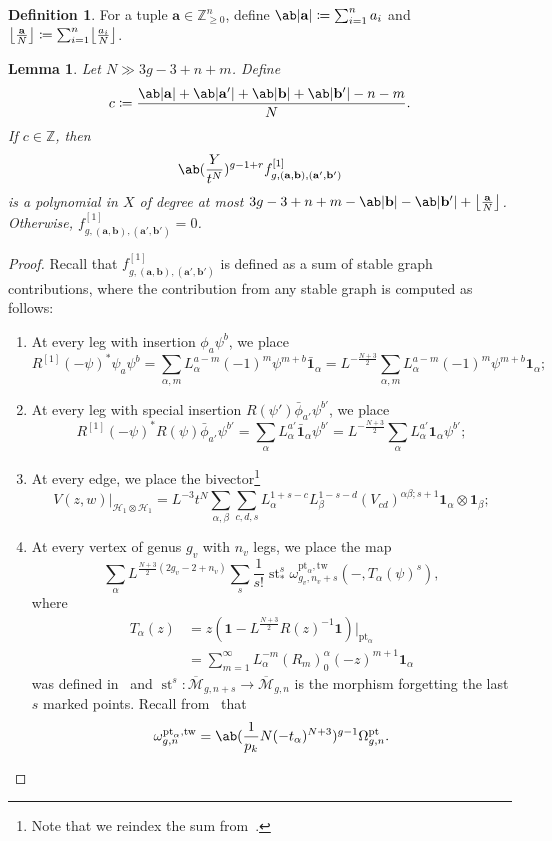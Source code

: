 \documentclass[10pt]{amsart}
\DeclarePairedDelimiter{\floor}{\lfloor}{\rfloor}
\newtheorem{lem}[thm]{Lemma}
\theoremstyle{definition}
\newtheorem{defn}[thm]{Definition}
\theoremstyle{remark}
\theoremstyle{plain}
\theoremstyle{definition}
\theoremstyle{remark}
\newcommand{\Z}{\mathbb{Z}}
\newcommand{\ba}{\mathbf{a}}
\newcommand{\bb}{\mathbf{b}}
\newcommand{\msc}[1]{\mathscr{#1}}
\newcommand{\mr}[1]{\mathrm{#1}}
\newcommand{\ol}[1]{\overline{#1}}
\newcommand{\1}{\mathbf{1}}
\newcommand{\2}{\mathbf{2}}
\newcommand{\3}{\mathbf{3}}
\newcommand{\pt}{\mr{pt}}
\newcommand{\tw}{\mr{tw}}
\DeclareMathOperator{\st}{st}
\numberwithin{equation}{section}
\begin{document}
\begin{defn}
    For a tuple $\ba \in \Z_{\geq 0}^n$, define $\ab|\ba| \coloneqq \sum_{i=1}^n a_i$ and $\floor*{\frac{\ba}{N}} \coloneqq \sum_{i=1}^n \floor*{\frac{a_i}{N}}$.
\end{defn}


\begin{lem}\label{lem:polynomiality1theory}
    Let $N \gg 3g-3+n+m$. Define
    \[ c \coloneqq \frac{\ab|\ba| + \ab|\ba'| + \ab|\bb| + \ab|\bb'| - n-m}{N}. \]
    If $c \in \Z$, then
    \[ \ab( \frac{Y}{t^N} )^{g-1+r} f_{g,(\ba,\bb),(\ba',\bb')}^{[1]} \]
    is a polynomial in $X$ of degree at most $3g-3+n+m-\ab|\bb|-\ab|\bb'| + \floor*{\frac{\ba}{N}}$. Otherwise, $f_{g,(\ba,\bb),(\ba',\bb')}^{[1]} = 0$.
\end{lem}

\begin{proof}
    Recall that $f^{[1]}_{g,(\ba,\bb),(\ba',\bb')}$ is defined as a sum of stable graph contributions, where the contribution from any stable graph is computed as follows:
    \begin{enumerate}
        \item At every leg with insertion $\phi_a \psi^b$, we place
            \[ R^{[1]}(-\psi)^* \psi_a \psi^b = \sum_{\alpha,m} L_{\alpha}^{a-m}(-1)^m \psi^{m+b} \bar{\1}_{\alpha} =  L^{-\frac{N+3}{2}}\sum_{\alpha,m} L_{\alpha}^{a-m}(-1)^m \psi^{m+b} \1_{\alpha}; \]
        \item At every leg with special insertion $R(\psi')\bar{\phi}_{a'}\psi^{b'}$, we place
            \[ R^{[1]}(-\psi)^* R(\psi) \bar{\phi}_{a'} \psi^{b'} = \sum_{\alpha} L_{\alpha}^{a'} \bar{\1}_{\alpha} \psi^{b'} = L^{-\frac{N+3}{2}} \sum_{\alpha} L_{\alpha}^{a'} \1_{\alpha}\psi^{b'}; \]
        \item At every edge, we place the bivector\footnote{Note that we reindex the sum from~.}
            \[ V(z,w)|_{\msc{H}_1 \otimes \msc{H}_1} = L^{-3} t^N \sum_{\alpha,\beta} \sum_{c,d,s} L_{\alpha}^{1+s-c} L_{\beta}^{1-s-d} (V_{cd})^{\alpha\beta;s+1} \1_{\alpha} \otimes \1_{\beta}; \]
        \item At every vertex of genus $g_v$ with $n_v$ legs, we place the map
            \[ \sum_{\alpha} L^{\frac{N+3}{2}(2g_v - 2 + n_v)} \sum_s \frac{1}{s!} \st^s_* \omega_{g_v,n_v+s}^{\pt_{\alpha},\tw} (-,T_{\alpha}(\psi)^s), \]
            where
            \begin{align*}
                T_{\alpha}(z) &= z(\1- L^{\frac{N+3}{2}} R(z)^{-1} \1) |_{\pt_{\alpha}} \\
                &= \sum_{m=1}^{\infty} L_{\alpha}^{-m} (R_m)_0^{\alpha} (-z)^{m+1} \1_{\alpha}
            \end{align*}
            was defined in~\cite[Theorem 3.6]{polynomiality} and $\st^s \colon \ol{\msc{M}}_{g,n+s} \to \ol{\msc{M}}_{g,n}$ is the morphism forgetting the last $s$ marked points. Recall from~\cite[Lemma 2.4]{polynomiality} that
            \[ \omega_{g,n}^{\pt_{\alpha},\tw} = \ab(\frac{1}{p_k}N(-t_{\alpha})^{N+3})^{g-1} \Omega_{g,n}^{\pt}. \]
    \end{enumerate}


\end{proof}
\end{document}
